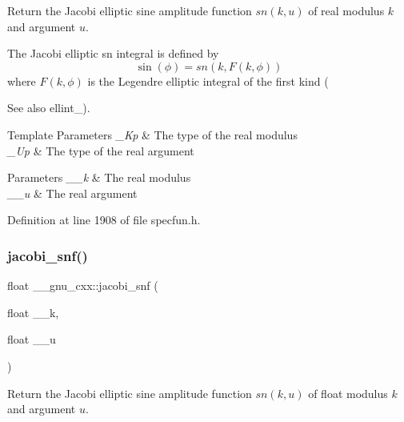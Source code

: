 Return the Jacobi elliptic sine amplitude function $ sn(k,u) $ of real modulus $ k $ and argument $ u $.

The Jacobi elliptic {\ttfamily sn} integral is defined by \[ \sin(\phi) = sn(k, F(k,\phi)) \] where $ F(k,\phi) $ is the Legendre elliptic integral of the first kind (\begin{DoxySeeAlso}{See also}
ellint\+\_).
\end{DoxySeeAlso}

\begin{DoxyTemplParams}{Template Parameters}
{\em \+\_\+\+Kp} & The type of the real modulus \\
\hline
{\em \+\_\+\+Up} & The type of the real argument \\
\hline
\end{DoxyTemplParams}

\begin{DoxyParams}{Parameters}
{\em \+\_\+\+\_\+k} & The real modulus \\
\hline
{\em \+\_\+\+\_\+u} & The real argument \\
\hline
\end{DoxyParams}


Definition at line 1908 of file specfun.\+h.

\mbox{\label{group__gnu__math__spec__func_ga5981245b7343da6e21d445bb01fdba9c}} 
\subsubsection{\texorpdfstring{jacobi\+\_\+snf()}{jacobi\_snf()}}
{\footnotesize\ttfamily float \+\_\+\+\_\+gnu\+\_\+cxx\+::jacobi\+\_\+snf (\begin{DoxyParamCaption}\item[{float}]{\+\_\+\+\_\+k,  }\item[{float}]{\+\_\+\+\_\+u }\end{DoxyParamCaption})\hspace{0.3cm}{\ttfamily [inline]}}

Return the Jacobi elliptic sine amplitude function $ sn(k,u) $ of {\ttfamily float} modulus $ k $ and argument $ u $.

